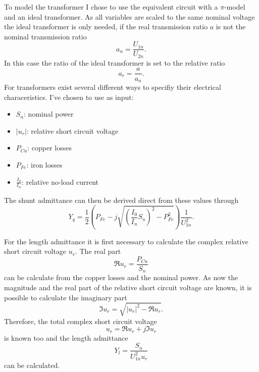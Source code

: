 To model the transformer I chose to use the equivalent circuit  with a $\pi$-model and an ideal transformer. As all variables are scaled to the same nominal voltage the ideal transformer is only needed, if the real transmission ratio $a$ is not the nominal transmission ratio
\begin{equation}
	a_n = \frac{U_{1n}}{U_{2n}}.
\end{equation}
In this case the ratio of the ideal transformer is set to the relative ratio
\begin{equation}
	a_r = \frac{a}{a_n}.
\end{equation}
For transformers exist several different ways to specifiy their electrical characeristics. I've chosen to use as input:
\begin{itemize}
	\item $S_n$: nominal power
	\item $|u_r|$: relative short circuit voltage
	\item $P_{Cu}$: copper losses
	\item $P_{Fe}$: iron losses
	\item $\frac{I_0}{I_n}$: relative no-load current
\end{itemize}

The shunt admittance can then be derived direct from these values through
\begin{equation}
	Y_q = \frac{1}{2} \left( P_{Fe} - j \sqrt{\left( \frac{I_0}{I_n} S_n \right)^2 - P_{Fe}^2} \right) \frac{1}{U_{1n}^2}.
\end{equation}

For the length admittance it is first necessary to calculate the complex relative short circuit voltage $u_r$. The real part
\begin{equation}
	\Re{u_r} = \frac{P_{Cu}}{S_n}
\end{equation}
can be calculate from the copper losses and the nominal power. As now the magnitude and the real part of the relative short circuit voltage are known, it is possible to calculate the imaginary part
\begin{equation}
	\Im{u_r} = \sqrt{|u_r|^2 - \Re{u_r}}.
\end{equation}
Therefore, the total complex short circuit voltage
\begin{equation}
	u_r = \Re{u_r} + j \Im{u_r}
\end{equation}
is known too and the length admittance
\begin{equation}
	Y_l = \frac{S_n}{U_{1n}^2 u_r}
\end{equation}
can be calculated.

